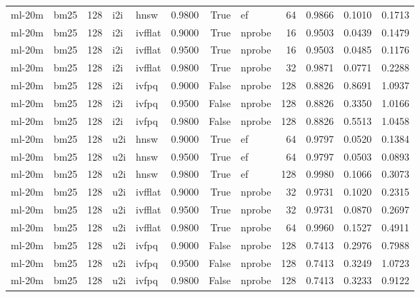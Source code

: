 \begin{tabular}{llrllrrlrrrr}
ml-20m & bm25 & 128 & i2i & hnsw & 0.9800 & True & ef & 64 & 0.9866 & 0.1010 & 0.1713 \\
ml-20m & bm25 & 128 & i2i & ivfflat & 0.9000 & True & nprobe & 16 & 0.9503 & 0.0439 & 0.1479 \\
ml-20m & bm25 & 128 & i2i & ivfflat & 0.9500 & True & nprobe & 16 & 0.9503 & 0.0485 & 0.1176 \\
ml-20m & bm25 & 128 & i2i & ivfflat & 0.9800 & True & nprobe & 32 & 0.9871 & 0.0771 & 0.2288 \\
ml-20m & bm25 & 128 & i2i & ivfpq & 0.9000 & False & nprobe & 128 & 0.8826 & 0.8691 & 1.0937 \\
ml-20m & bm25 & 128 & i2i & ivfpq & 0.9500 & False & nprobe & 128 & 0.8826 & 0.3350 & 1.0166 \\
ml-20m & bm25 & 128 & i2i & ivfpq & 0.9800 & False & nprobe & 128 & 0.8826 & 0.5513 & 1.0458 \\
ml-20m & bm25 & 128 & u2i & hnsw & 0.9000 & True & ef & 64 & 0.9797 & 0.0520 & 0.1384 \\
ml-20m & bm25 & 128 & u2i & hnsw & 0.9500 & True & ef & 64 & 0.9797 & 0.0503 & 0.0893 \\
ml-20m & bm25 & 128 & u2i & hnsw & 0.9800 & True & ef & 128 & 0.9980 & 0.1066 & 0.3073 \\
ml-20m & bm25 & 128 & u2i & ivfflat & 0.9000 & True & nprobe & 32 & 0.9731 & 0.1020 & 0.2315 \\
ml-20m & bm25 & 128 & u2i & ivfflat & 0.9500 & True & nprobe & 32 & 0.9731 & 0.0870 & 0.2697 \\
ml-20m & bm25 & 128 & u2i & ivfflat & 0.9800 & True & nprobe & 64 & 0.9960 & 0.1527 & 0.4911 \\
ml-20m & bm25 & 128 & u2i & ivfpq & 0.9000 & False & nprobe & 128 & 0.7413 & 0.2976 & 0.7988 \\
ml-20m & bm25 & 128 & u2i & ivfpq & 0.9500 & False & nprobe & 128 & 0.7413 & 0.3249 & 1.0723 \\
ml-20m & bm25 & 128 & u2i & ivfpq & 0.9800 & False & nprobe & 128 & 0.7413 & 0.3233 & 0.9122 \\
\bottomrule
\end{tabular}
